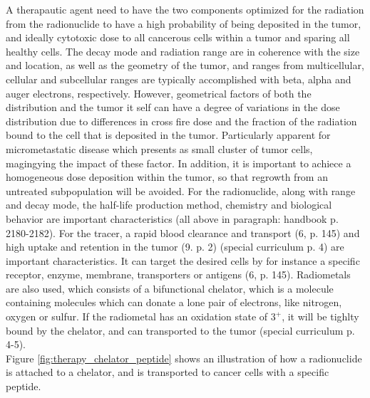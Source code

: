\documentclass[a4paper,11pt,twoside]{book}
\begin{document}
A therapautic agent need to have the two components optimized for the radiation from the radionuclide to have a high probability of being deposited in the tumor, and ideally cytotoxic dose to all cancerous cells within a tumor and sparing all healthy cells. The decay mode and radiation range are in coherence with the size and location, as well as the geometry of the tumor, and ranges from multicellular, cellular and subcellular ranges are typically accomplished with beta, alpha and auger electrons, respectively. However, geometrical factors of both the distribution and the tumor it self can have a degree of variations in the dose distribution due to differences in cross fire dose and the fraction of the radiation bound to the cell that is deposited in the tumor. Particularly apparent for micrometastatic disease which presents as small cluster of tumor cells, magingying the impact of these factor. In addition, it is important to achiece a homogeneous dose deposition within the tumor, so that regrowth from an untreated subpopulation will be avoided. For the radionuclide, along with range and decay mode, the half-life production method, chemistry and biological behavior are important characteristics (all above in paragraph: handbook p. 2180-2182). For the tracer, a rapid blood clearance and transport (6, p. 145) and high uptake and retention in the tumor (9. p. 2)    (special curriculum p. 4) are important characteristics. It can target the desired cells by for instance a specific receptor, enzyme, membrane, transporters or antigens (6, p. 145). Radiometals are also used, which consists of a bifunctional chelator, which is a molecule containing molecules which can donate a lone pair of electrons, like nitrogen, oxygen or sulfur. If the radiometal has an oxidation state of $3^+$, it will be tighlty bound by the chelator, and can transported to the tumor (special curriculum p. 4-5). \\

Figure \ref{fig:therapy_chelator_peptide} shows an illustration of how a radionuclide is attached to a chelator, and is transported to cancer cells with a specific peptide. 
\end{document}
